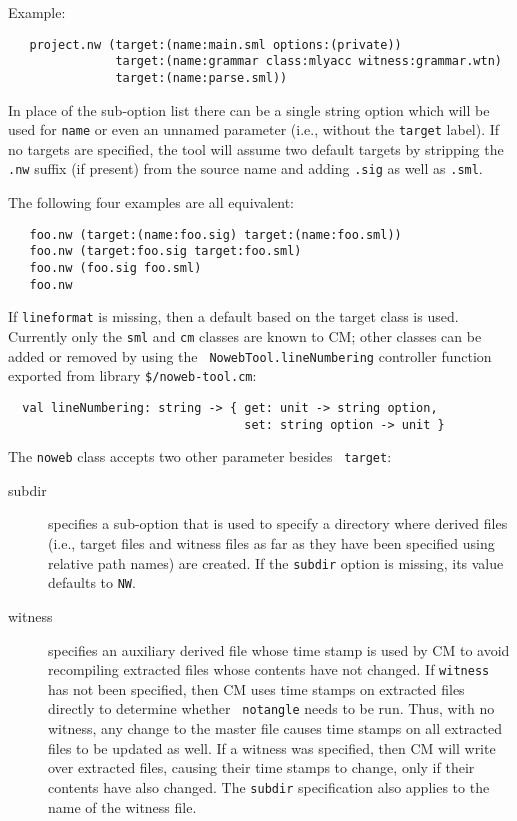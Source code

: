\documentclass[titlepage,letterpaper]{article}
\begin{document}
Example:

\begin{verbatim}
   project.nw (target:(name:main.sml options:(private))
               target:(name:grammar class:mlyacc witness:grammar.wtn)
               target:(name:parse.sml))
\end{verbatim}

In place of the sub-option list there can be a single string option
which will be used for {\tt name} or even an unnamed parameter (i.e.,
without the {\tt target} label).  If no targets are specified, the
tool will assume two default targets by stripping the {\tt .nw}
suffix (if present) from the source name and adding {\tt .sig} as well
as {\tt .sml}.

The following four examples are all equivalent:

\begin{verbatim}
   foo.nw (target:(name:foo.sig) target:(name:foo.sml))
   foo.nw (target:foo.sig target:foo.sml)
   foo.nw (foo.sig foo.sml)
   foo.nw
\end{verbatim}

If {\tt lineformat} is missing, then a default based on the target
class is used.  Currently only the {\tt sml} and {\tt cm} classes are
known to CM; other classes can be added or removed by using the {\tt
NowebTool.lineNumbering} controller function exported from library
{\tt \$/noweb-tool.cm}:

\begin{verbatim}
  val lineNumbering: string -> { get: unit -> string option,
                                 set: string option -> unit }
\end{verbatim}

The {\tt noweb} class accepts two other parameter besides {\tt
target}:

\begin{description}
\item[subdir] specifies a sub-option that is used to specify a
directory where derived files (i.e., target files and witness files as
far as they have been specified using relative path names) are
created.  If the {\tt subdir} option is missing, its value defaults to
{\tt NW}.
\item[witness] specifies an auxiliary derived file whose time stamp is
used by CM to avoid recompiling extracted files whose contents have
not changed.  If {\tt witness} has not been specified, then CM uses
time stamps on extracted files directly to determine whether {\tt
notangle} needs to be run.  Thus, with no witness, any change to the
master file causes time stamps on all extracted files to be updated as
well.  If a witness was specified, then CM will write over extracted
files, causing their time stamps to change, only if their contents
have also changed.  The {\tt subdir} specification also applies to the
name of the witness file.
\end{description}
\end{document}

